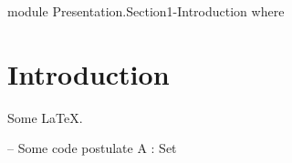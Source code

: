 \begin{code}[hide]
module Presentation.Section1-Introduction where
\end{code}

\section{Introduction}

Some \LaTeX.

\begin{code}
-- Some code
postulate A : Set
\end{code}
